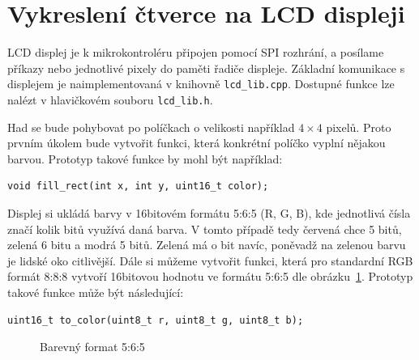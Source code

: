 \documentclass[12pt]{article}
\begin{document}
\section{Vykreslení čtverce na LCD displeji}
LCD displej je k mikrokontroléru připojen pomocí SPI rozhrání, a posílame příkazy nebo jednotlivé pixely do paměti řadiče displeje.
Základní komunikace s displejem je naimplementovaná v knihovně \texttt{lcd\_lib.cpp}.
Dostupné funkce lze nalézt v hlavičkovém souboru \texttt{lcd\_lib.h}.

Had se bude pohybovat po políčkach o velikosti například $4\times4$ pixelů.
Proto prvním úkolem bude vytvořit funkci, která konkrétní políčko vyplní nějakou barvou.
Prototyp takové funkce by mohl být například:
\begin{verbatim}
void fill_rect(int x, int y, uint16_t color);
\end{verbatim}

Displej si ukládá barvy v 16bitovém formátu 5:6:5 (R, G, B), kde jednotlivá čísla značí kolik bitů využívá daná barva.
V tomto případě tedy červená chce 5 bitů, zelená 6 bitu a modrá 5 bitů.
Zelená má o bit navíc, poněvadž na zelenou barvu je lidské oko citlivější.
Dále si můžeme vytvořit funkci, která  pro standardní RGB formát 8:8:8 vytvoří 16bitovou hodnotu ve formátu 5:6:5 dle obrázku~\ref{fig:rgb565}.
Prototyp takové funkce může být následující:
\begin{verbatim}
uint16_t to_color(uint8_t r, uint8_t g, uint8_t b);
\end{verbatim}

\begin{figure}[ht]
	\centering
	\caption{Barevný format 5:6:5}
  \label{fig:rgb565}
\end{figure}
\end{document}
